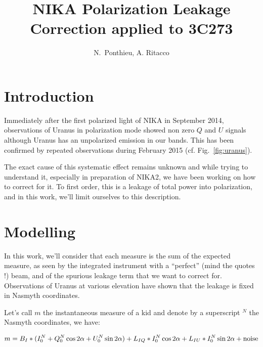 \documentclass[a4paper,10pt]{article}
\title{NIKA Polarization Leakage Correction applied to 3C273}
\author{N.~Ponthieu, A. Ritacco}
\begin{document}
\maketitle


\section{Introduction}

Immediately after the first polarized light of NIKA in September 2014,
observations of Uranus in polarization mode showed non zero $Q$ and $U$ signals
although Uranus has an unpolarized emission in our bands. This has been
confirmed by repeated observations during February 2015
(cf. Fig.~\ref{fig:uranus}).


The exact cause of this systematic effect remains unknown and while trying to
understand it, especially in preparation of NIKA2, we have been working on how
to correct for it. To first order, this is a leakage of total power into
polarization, and in this work, we'll limit ourselves to this description.

\section{Modelling}

In this work, we'll consider that each measure is the sum of the expected
measure, as seen by the integrated instrument with a ``perfect'' (mind the
quotes !) beam, and of the spurious leakage term that we want to correct
for. Observations of Uranus at various elevation have shown that the leakage is
fixed in Nasmyth coordinates.

Let's call $m$ the instantaneous measure of a kid and denote by a superscript $^N$
the Nasmyth coordinates, we have:

\begin{equation}
m = B_I * (I^N_0 + Q^N_0\cos2\alpha + U^N_0\sin2\alpha) + L_{IQ}*I^N_0\cos2\alpha +
L_{IU} * I^N_0\sin2\alpha + {\rm noise}
\end{equation}
\end{document}
